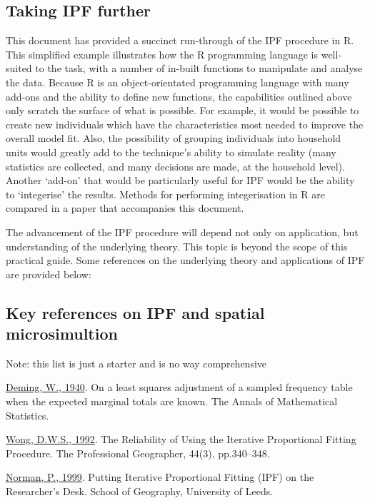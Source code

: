 \subsection{Taking IPF further}

This document has provided a succinct run-through of the IPF procedure
in R. This simplified example illustrates how the R programming language
is well-suited to the task, with a number of in-built functions to
manipulate and analyse the data. Because R is an object-orientated
programming language with many add-ons and the ability to define new
functions, the capabilities outlined above only scratch the surface of
what is possible. For example, it would be possible to create new
individuals which have the characteristics most needed to improve the
overall model fit. Also, the possibility of grouping individuals into
household units would greatly add to the technique's ability to simulate
reality (many statistics are collected, and many decisions are made, at
the household level). Another `add-on' that would be particularly useful
for IPF would be the ability to `integerise' the results. Methods for
performing integerisation in R are compared in a paper that accompanies
this document.

The advancement of the IPF procedure will depend not only on
application, but understanding of the underlying theory. This topic is
beyond the scope of this practical guide. Some references on the
underlying theory and applications of IPF are provided below:

\subsection{Key references on IPF and spatial microsimultion}

Note: this list is just a starter and is no way comprehensive

\href{http://www.jstor.org/stable/2235722}{Deming, W., 1940}. On a least
squares adjustment of a sampled frequency table when the expected
marginal totals are known. The Annals of Mathematical Statistics.

\href{http://dx.doi.org/10.1111/j.0033-0124.1992.00340.x}{Wong, D.W.S.,
1992}. The Reliability of Using the Iterative Proportional Fitting
Procedure. The Professional Geographer, 44(3), pp.340--348.

\href{http://eprints.whiterose.ac.uk/5029/1/99-3.pdf}{Norman, P., 1999}.
Putting Iterative Proportional Fitting (IPF) on the Researcher's Desk.
School of Geography, University of Leeds.

